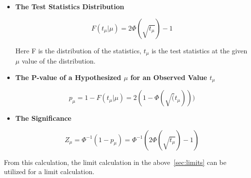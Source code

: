 \begin{itemize}
    \item \textbf{The Test Statistics Distribution}

\begin{equation}
    F(t_{\mu}| \mu) = 2\Phi(\sqrt{t_{\mu}})-1
\label{eq:teststatistics}
\end{equation}

Here F is the distribution of the statistics, $t_\mu$ is the test statistics at the given $\mu$ value of the distribution. 

\item \textbf{The P-value of a Hypothesized $\mu$ for an Observed Value $t_\mu$}

\begin{equation}
p_{\mu} = 1-F(t_{\mu}| \mu)=2(1-\Phi(\sqrt(t_{\mu})))
\end{equation}


\item \textbf{The Significance}

\begin{equation}
Z_{\mu} = \Phi^{-1}(1-p_{\mu})  = \Phi^{-1}(2\Phi(\sqrt{t_{\mu}})-1)
\end{equation}

\end{itemize}

From this calculation, the limit calculation in the above~\ref{sec:limits} can be utilized for a limit calculation. 

%
%
%



%
%


